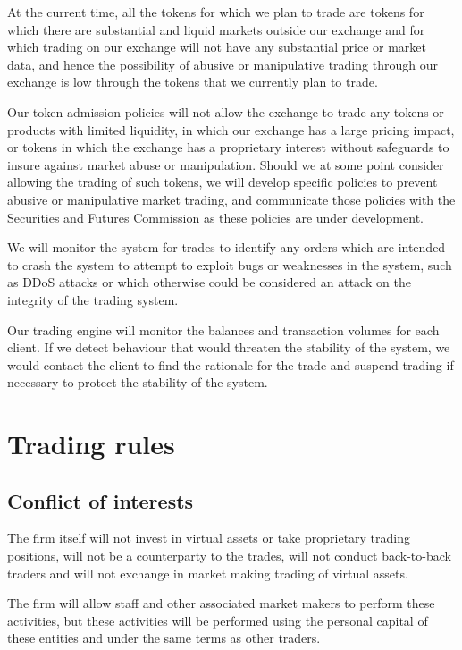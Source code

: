 At the current time, all the tokens for which we plan to trade are
tokens for which there are substantial and liquid markets outside
our exchange and for which trading on our exchange will not have any
substantial price or market data, and hence the possibility of abusive
or manipulative trading through our exchange is low through the tokens
that we currently plan to trade.

Our token admission policies will not allow the exchange to trade any
tokens or products with limited liquidity, in which our exchange has a
large pricing impact, or tokens in which the exchange has a
proprietary interest without safeguards to insure against market abuse
or manipulation.  Should we at some point consider allowing the trading of
such tokens, we will develop specific policies to prevent abusive or
manipulative market trading, and communicate those policies with the
Securities and Futures Commission as these policies are under
development.

We will monitor the system for trades to identify any orders which are
intended to crash the system to attempt to exploit bugs or weaknesses
in the system, such as DDoS attacks or which otherwise could be considered an
attack on the integrity of the trading system.

Our trading engine will monitor the balances and transaction volumes
for each client.  If we detect behaviour that would
threaten the stability of the system, we would contact the client to
find the rationale for the trade and suspend trading if necessary to
protect the stability of the system.

\section{Trading rules}

\subsection{Conflict of interests}
The firm itself will not invest in virtual assets or take proprietary
trading positions, will not be a counterparty to the trades, will not
conduct back-to-back traders and will not exchange in market making
trading of virtual assets.

The firm will allow staff and other associated market makers to
perform these activities, but these activities will be performed using
the personal capital of these entities and under the same terms as
other traders.

